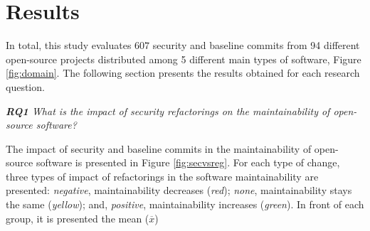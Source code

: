 \documentclass[10pt,conference]{IEEEtran}
\begin{document}
\section{Results}\label{sec:results}

In total, this study evaluates $607$ security and baseline commits from 94
different open-source projects distributed among 5 different main types of
software, Figure \ref{fig:domain}. The following section presents the results
obtained for each research question.

\begin{framed}
\textit{\textbf{RQ1} What is the impact of security refactorings on the
maintainability of open-source software?}
\end{framed}


The impact of security and baseline commits in the maintainability of
open-source software is presented in Figure \ref{fig:secvsreg}. For each type
of change, three types of impact of refactorings in the software maintainability
are presented: \emph{negative}, maintainability decreases (\emph{red}); \emph{none},
maintainability stays the same (\emph{yellow}); and, \emph{positive}, maintainability
increases (\emph{green}). In front of each group, it is presented the mean ($\overline{x}$)
\end{document}
